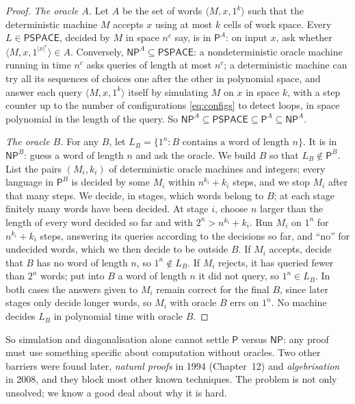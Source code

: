 \begin{proof}
\emph{The oracle $A$.} Let $A$ be the set of words $\langle M,x,1^k\rangle$ such that the deterministic machine $M$ accepts $x$ using at most $k$ cells of work space. Every $L\in\mathsf{PSPACE}$, decided by $M$ in space $n^c$ say, is in $\mathsf P^A$: on input $x$, ask whether $\langle M,x,1^{|x|^c}\rangle\in A$. Conversely, $\mathsf{NP}^A\subseteq\mathsf{PSPACE}$: a nondeterministic oracle machine running in time $n^c$ asks queries of length at most $n^c$; a deterministic machine can try all its sequences of choices one after the other in polynomial space, and answer each query $\langle M,x,1^k\rangle$ itself by simulating $M$ on $x$ in space $k$, with a step counter up to the number of configurations \eqref{eq:configs} to detect loops, in space polynomial in the length of the query. So $\mathsf{NP}^A\subseteq\mathsf{PSPACE}\subseteq\mathsf P^A\subseteq\mathsf{NP}^A$.

\emph{The oracle $B$.} For any $B$, let $L_B=\{1^n:B\text{ contains a word of length }n\}$. It is in $\mathsf{NP}^B$: guess a word of length $n$ and ask the oracle. We build $B$ so that $L_B\notin\mathsf P^B$. List the pairs $(M_i,k_i)$ of deterministic oracle machines and integers; every language in $\mathsf P^B$ is decided by some $M_i$ within $n^{k_i}+k_i$ steps, and we stop $M_i$ after that many steps. We decide, in stages, which words belong to $B$; at each stage finitely many words have been decided. At stage $i$, choose $n$ larger than the length of every word decided so far and with $2^n>n^{k_i}+k_i$. Run $M_i$ on $1^n$ for $n^{k_i}+k_i$ steps, answering its queries according to the decisions so far, and ``no'' for undecided words, which we then decide to be outside $B$. If $M_i$ accepts, decide that $B$ has no word of length $n$, so $1^n\notin L_B$. If $M_i$ rejects, it has queried fewer than $2^n$ words; put into $B$ a word of length $n$ it did not query, so $1^n\in L_B$. In both cases the answers given to $M_i$ remain correct for the final $B$, since later stages only decide longer words, so $M_i$ with oracle $B$ errs on $1^n$. No machine decides $L_B$ in polynomial time with oracle $B$.
\end{proof}

So simulation and diagonalisation alone cannot settle $\mathsf P$ versus $\mathsf{NP}$: any proof must use something specific about computation without oracles. Two other barriers were found later, \emph{natural proofs} in 1994 (Chapter~12) and \emph{algebrisation} in 2008, and they block most other known techniques. The problem is not only unsolved; we know a good deal about why it is hard.

